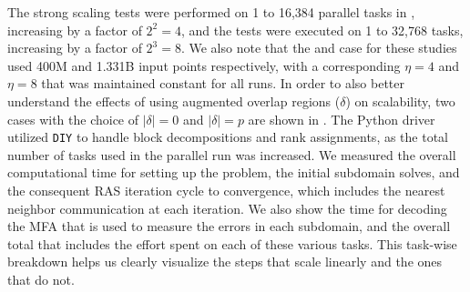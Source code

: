 
The strong scaling tests were performed on 1 to 16,384 parallel tasks in , increasing by a factor of $2^2=4$, and the  tests were executed on 1 to 32,768 tasks, increasing by a factor of $2^3=8$. We also note that the  and  case for these studies used 400M and 1.331B input points respectively, with a corresponding $\eta=4$ and $\eta=8$ that was maintained constant for all runs. In order to also better understand the effects of using augmented overlap regions ($\delta$) on scalability, two cases with the choice of $\left| \delta \right|=0$ and $\left| \delta \right|=p$ are shown in . 
%
%
The Python driver utilized \texttt{DIY} to handle block decompositions and rank assignments, as the total number of tasks used in the parallel run was increased. We measured the overall computational time for setting up the problem, the initial subdomain solves, and the consequent RAS iteration cycle to convergence, which includes the nearest neighbor communication at each iteration. We also show the time for decoding the MFA that is used to measure the errors in each subdomain, and the overall total that includes the effort spent on each of these various tasks. This task-wise breakdown helps us clearly visualize the steps that scale linearly and the ones that do not.





